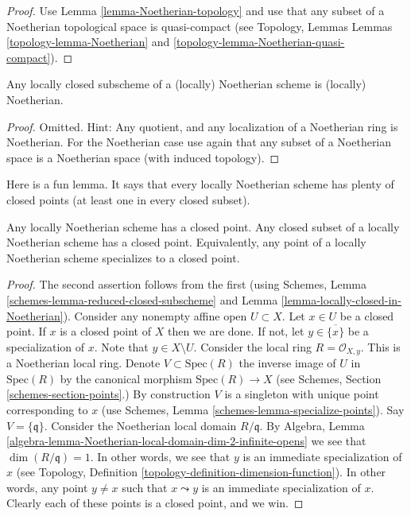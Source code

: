 \begin{proof}
Use Lemma \ref{lemma-Noetherian-topology}
and use that any subset of a Noetherian topological
space is quasi-compact (see Topology, Lemmas
Lemmas \ref{topology-lemma-Noetherian} and
\ref{topology-lemma-Noetherian-quasi-compact}).
\end{proof}

\begin{lemma}
\label{lemma-locally-closed-in-Noetherian}
Any locally closed subscheme of a (locally) Noetherian
scheme is (locally) Noetherian.
\end{lemma}

\begin{proof}
Omitted. Hint: Any quotient, and any localization of a Noetherian 
ring is Noetherian. For the Noetherian case use again
that any subset of a Noetherian space is a Noetherian space
(with induced topology).
\end{proof}

\noindent
Here is a fun lemma.
It says that every locally Noetherian scheme has plenty of
closed points (at least one in every closed subset).

\begin{lemma}
\label{lemma-locally-Noetherian-closed-point}
Any locally Noetherian scheme has a closed point.
Any closed subset of a locally Noetherian scheme has a closed point.
Equivalently, any point of a locally Noetherian scheme specializes
to a closed point.
\end{lemma}

\begin{proof}
The second assertion follows from the first (using
Schemes, Lemma \ref{schemes-lemma-reduced-closed-subscheme}
and Lemma \ref{lemma-locally-closed-in-Noetherian}).
Consider any nonempty affine open $U \subset X$.
Let $x \in U$ be a closed point. If $x$ is a closed point
of $X$ then we are done. If not, let $y \in \overline{\{x\}}$
be a specialization of $x$. Note that $y \in X \setminus U$.
Consider the local ring $R = \mathcal{O}_{X, y}$.
This is a Noetherian local ring. Denote $V \subset \text{Spec}(R)$
the inverse image of $U$ in $\text{Spec}(R)$ by the canonical morphism
$\text{Spec}(R) \to X$ (see Schemes, Section \ref{schemes-section-points}.)
By construction $V$ is a singleton with unique point
corresponding to $x$ (use
Schemes, Lemma \ref{schemes-lemma-specialize-points}).
Say $V = \{\mathfrak q\}$. Consider the Noetherian
local domain $R/\mathfrak q$. By
Algebra, Lemma \ref{algebra-lemma-Noetherian-local-domain-dim-2-infinite-opens}
we see that $\dim(R/\mathfrak q) = 1$.
In other words, we see that $y$ is an immediate specialization
of $x$ (see Topology, Definition \ref{topology-definition-dimension-function}).
In other words, any
point $y \not = x$ such that $x \leadsto y$ is an immediate
specialization of $x$. Clearly each of these points is a
closed point, and we win.
\end{proof}

